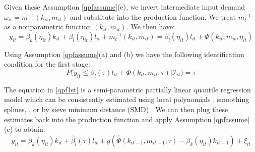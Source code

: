\documentclass[11pt]{article}
\begin{document}
Given these Assumption \eqref{qpfassume}(e), we invert intermediate input demand $\omega_{it}=m^{-1}(k_{it}, m_{it})$ and substitute into the production function. We treat $m_{t}^{-1}$ as a nonparametric function $(k_{it}, m_{it})$. We then have:
\begin{equation} \label{qpf1st}
y_{it}=\beta_{k}(\eta_{it})k_{it}+\beta_{l}(\eta_{it})l_{it}+m_{t}^{-1}(k_{it}, m_{it})=\beta_{l}(\eta_{it})l_{it}+\Phi(k_{it}, m_{it}, \eta_{it})
\end{equation}

Using Assumption \eqref{qpfassume}(a) and (b) we have the following identification condition for the first stage:
\begin{equation} \label{1ststageident}
	P\big(y_{it}\leq \beta_{l}(\tau)l_{it}+\Phi(k_{it}, m_{it}; \tau)\big|\mathcal{I}_{it})=\tau
\end{equation}

The equation in \eqref{qpf1st} is a semi-parametric partially linear quantile regression model which can be consistently estimated using local polynomials \citep{Lee2003}, smoothing splines, \cite{KOENKER1994}, or by sieve minimum distance (SMD) \citep{Chen2009}. We can then plug these estimates back into the production function and apply Assumption \eqref{qpfassume}(c) to obtain:
\begin{equation} \label{qpf2nd}
y_{it}=\beta_{k}(\eta_{it})k_{it}+\hat{\beta}_{l}(\tau)l_{it}+g(\hat{\Phi}(k_{it-1}, m_{it-1}; \tau)-\beta_{k}(\eta_{it})k_{it-1})+\xi_{it}
\end{equation}
\end{document}

